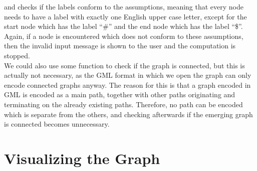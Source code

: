 \documentclass[a4paper,12pt,twoside,BCOR=10mm]{scrbook}
\begin{document}
and checks if the labels conform to the assumptions, meaning that every node needs to have a 
label with exactly one English upper case letter, except for the start node which has the label “$\#$” and 
the end node which has the label “\$”. 
Again, if a node is encountered which does not conform to these assumptions, then the invalid input message 
is shown to the user and the computation is stopped. \\
We could also use some function to check if the graph is connected, 
but this is actually not necessary, as the GML format in which we open the graph can only encode connected 
graphs anyway. The reason for this is that a graph encoded in GML is encoded as a main path, 
together with other paths originating and terminating on the already existing paths. 
Therefore, no path can be encoded which is separate from the others, and checking afterwards if 
the emerging graph is connected becomes unnecessary.

\section{Visualizing the Graph}
%
\end{document}
